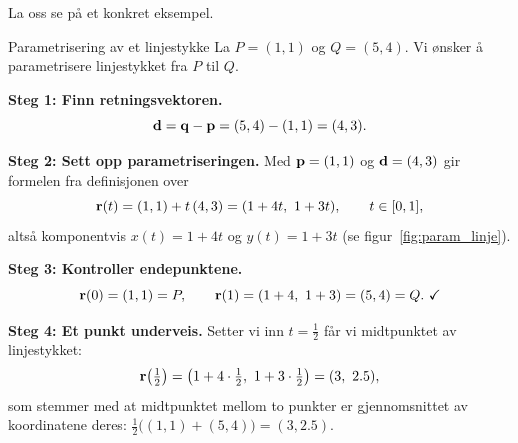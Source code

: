 La oss se på et konkret eksempel.

\begin{eks}{Parametrisering av et linjestykke}\label{eks:param-linje}
La $P=(1,1)$ og $Q=(5,4)$. Vi ønsker å parametrisere linjestykket fra $P$ til $Q$.

\begin{center}
\label{fig:param_linje}
\end{center}

\textbf{Steg 1: Finn retningsvektoren.}
\[
\mathbf{d} = \mathbf{q}-\mathbf{p} = (5,4)-(1,1) = (4,3).
\]

\textbf{Steg 2: Sett opp parametriseringen.} Med $\mathbf{p}=(1,1)$ og $\mathbf{d}=(4,3)$ gir formelen fra definisjonen over
\[
\mathbf{r}(t) = (1,1) + t\,(4,3) = (1+4t,\ 1+3t), \qquad t\in[0,1],
\]
altså komponentvis $x(t)=1+4t$ og $y(t)=1+3t$ (se figur~\ref{fig:param_linje}).

\textbf{Steg 3: Kontroller endepunktene.}
\[
\mathbf{r}(0) = (1,1) = P, \qquad \mathbf{r}(1) = (1+4,\ 1+3) = (5,4) = Q. \ \checkmark
\]

\textbf{Steg 4: Et punkt underveis.} Setter vi inn $t=\tfrac12$ får vi midtpunktet av linjestykket:
\[
\mathbf{r}\!\left(\tfrac12\right) = \left(1+4\cdot\tfrac12,\ 1+3\cdot\tfrac12\right) = (3,\ 2.5),
\]
som stemmer med at midtpunktet mellom to punkter er gjennomsnittet av koordinatene deres: $\tfrac12\big((1,1)+(5,4)\big) = (3,2.5)$.
\end{eks}

